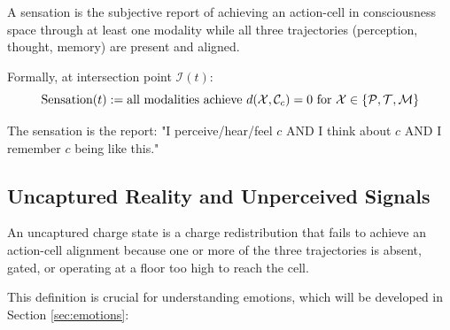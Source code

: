 \begin{principle}
\label{prin:sensation}
A sensation is the subjective report of achieving an action-cell in consciousness space through at least one modality while all three trajectories (perception, thought, memory) are present and aligned.

Formally, at intersection point $\mathcal{I}(t)$:
$$\text{Sensation}(t) := \text{all modalities achieve } d(\mathcal{X}, \mathcal{C}_c) = 0 \text{ for } \mathcal{X} \in \{\mathcal{P}, \mathcal{T}, \mathcal{M}\}$$

The sensation is the report: "I perceive/hear/feel $c$ AND I think about $c$ AND I remember $c$ being like this."
\end{principle}


\subsection{Uncaptured Reality and Unperceived Signals}

\begin{definition}
An uncaptured charge state is a charge redistribution that fails to achieve an action-cell alignment because one or more of the three trajectories is absent, gated, or operating at a floor too high to reach the cell.
\end{definition}

This definition is crucial for understanding emotions, which will be developed in Section \ref{sec:emotions}:

